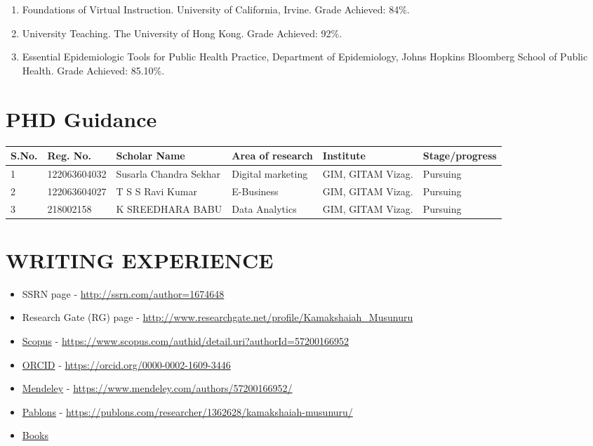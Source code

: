 \documentclass[10pt]{article}
\begin{document}
\begin{enumerate}
	\item Foundations of Virtual Instruction. University of California, Irvine. Grade Achieved: 84\%.
\item University Teaching. The University of Hong Kong. Grade Achieved: 92\%.
\item Essential Epidemiologic Tools for Public Health Practice, Department of Epidemiology, Johns Hopkins Bloomberg School of Public Health. Grade Achieved: 85.10\%.

\end{enumerate}

\section{PHD Guidance}

\begin{table}[ht]
\small
\centering 
\begin{tabular}{llllll} \hline 
S.No. & Reg. No. & Scholar Name & Area of research & Institute & Stage/progress \\ \hline 
1 & 122063604032 & Susarla Chandra Sekhar & Digital marketing & GIM, GITAM Vizag. & Pursuing \\ 
2 & 122063604027 & T S S Ravi Kumar & E-Business & GIM, GITAM Vizag. & Pursuing \\
3 & 218002158 & K SREEDHARA BABU & Data Analytics & GIM, GITAM Vizag. & Pursuing \\ \hline 
\end{tabular}
\end{table}

\section{WRITING EXPERIENCE} \hline \vspace{0.5cm}

\begin{mdframed} 
\begin{itemize} 
\item SSRN page  - \url{http://ssrn.com/author=1674648} 
\item Research Gate (RG) page - \url{http://www.researchgate.net/profile/Kamakshaiah_Musunuru} 
\item \href{https://www.scopus.com/authid/detail.uri?authorId=57200166952}{Scopus} - \url{https://www.scopus.com/authid/detail.uri?authorId=57200166952}
\item \href{https://orcid.org/0000-0002-1609-3446}{ORCID} - \url{https://orcid.org/0000-0002-1609-3446}
\item \href{https://www.mendeley.com/authors/57200166952/}{Mendeley} - \url{https://www.mendeley.com/authors/57200166952/}
\item \href{https://publons.com/researcher/1362628/kamakshaiah-musunuru/}{Pablons} - \url{https://publons.com/researcher/1362628/kamakshaiah-musunuru/}
\item \href{https://www.amazon.in/Books-Musunuru-Kamakshaiah/s?rh=n\%3A976389031\%2Cp_27\%3AMusunuru+Kamakshaiah}{Books}

\end{itemize} 
\end{mdframed} 
\end{document}

